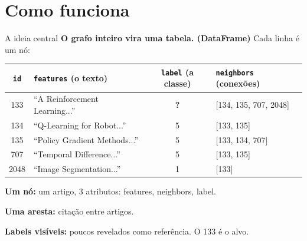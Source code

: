 \documentclass{beamer}
\begin{document}
\section{Como funciona}
\begin{frame}{A ideia central}
  \textbf{O grafo inteiro vira uma tabela. (DataFrame)} Cada linha é um nó:

  \vspace{0.3em}
  \begin{table}
    \centering
    \footnotesize
    \begin{tabular}{clcl}
      \toprule
      \texttt{id} & \texttt{features} (o texto) & \texttt{label} (a classe) & \texttt{neighbors} (conexões) \\
      \midrule
      133 & ``A Reinforcement Learning...''  & \textbf{?} & [134, 135, 707, 2048] \\
      134 & ``Q-Learning for Robot...''      & 5   & [133, 135] \\
      135 & ``Policy Gradient Methods...''   & 5   & [133, 134, 707] \\
      707 & ``Temporal Difference...''       & 5   & [133, 135] \\
      2048 & ``Image Segmentation...''       & 1   & [133] \\
      \bottomrule
    \end{tabular}
  \end{table}

  \vspace{0.5em}
  {\small
  \textbf{Um nó:} um artigo, 3 atributos: features, neighbors, label.

  \vspace{0.2em}
  \textbf{Uma aresta:} citação entre artigos.

  \vspace{0.2em}
  \textbf{Labels visíveis:} poucos revelados como referência. O 133 é o alvo.
  }
\end{frame}
\end{document}
